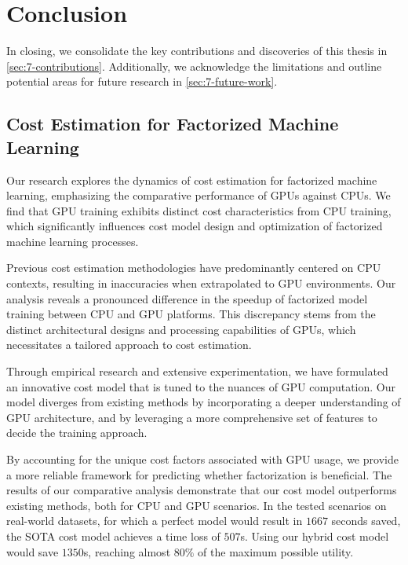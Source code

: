 
\chapter{Conclusion}

\label{chapter:conclusion}
In closing, we consolidate the key contributions and discoveries of this thesis in \autoref{sec:7-contributions}. Additionally, we acknowledge the limitations and outline potential areas for future research in \autoref{sec:7-future-work}.

\section{Cost Estimation for Factorized Machine Learning}
\label{sec:7-contributions}
Our research explores the dynamics of cost estimation for factorized machine learning, emphasizing the comparative performance of GPUs against CPUs. We find that GPU training exhibits distinct cost characteristics from CPU training, which significantly influences cost model design and optimization of factorized machine learning processes.

Previous cost estimation methodologies have predominantly centered on CPU contexts, resulting in inaccuracies when extrapolated to GPU environments. Our analysis reveals a pronounced difference in the speedup of factorized model training between CPU and GPU platforms. This discrepancy stems from the distinct architectural designs and processing capabilities of GPUs, which necessitates a tailored approach to cost estimation.

Through empirical research and extensive experimentation, we have formulated an innovative cost model that is tuned to the nuances of GPU computation. Our model diverges from existing methods by incorporating a deeper understanding of GPU architecture, and by leveraging a more comprehensive set of features to decide the training approach.

By accounting for the unique cost factors associated with GPU usage, we provide a more reliable framework for predicting whether factorization is beneficial. The results of our comparative analysis demonstrate that our cost model outperforms existing methods, both for CPU and GPU scenarios. In the tested scenarios on real-world datasets, for which a perfect model would result in $1667$ seconds saved, the SOTA cost model achieves a time loss of $507$s. Using our hybrid cost model would save $1350$s, reaching almost $80\%$ of the maximum possible utility.


